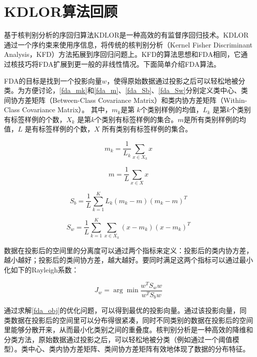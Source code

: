\section{KDLOR算法回顾}
基于核判别分析的序回归算法KDLOR\citep{sun2010kernel}是一种高效的有监督序回归技术。KDLOR通过一个序约束来使用序信息，将传统的核判别分析（Kernel Fisher Discriminant Analysis，KFD）方法拓展到序回归问题上。KFD的算法思想和FDA相同，它通过核技巧将FDA扩展到更一般的非线性情况。下面简单介绍FDA算法。

FDA的目标是找到一个投影向量\(w\)，使得原始数据通过投影之后可以轻松地被分类。为方便讨论，\autoref{fda_mk}和\autoref{fda_m}、\autoref{fda_Sb}、\autoref{fda_Sw}分别定义类中心、类间协方差矩阵（Between-Class Covariance Matrix）和类内协方差矩阵（Within-Class Covariance Matrix）。 其中，\(m_{k}\)是第 \(k\)个类别样例的均值，\(L_{k}\) 是第\(k\)个类别有标签样例的个数，\(X_{k}\) 是第\(k\)个类别有标签样例的集合。\(m\)是所有类别样例的均值，\(L\) 是有标签样例的个数，\(X\) 所有类别有标签样例的集合。

\begin{equation}
\label{fda_mk}
m_{k}=\frac{1}{L_{k}}\sum_{x\in X_{k}}x
\end{equation}

\begin{equation}
\label{fda_m}
m =\frac{1}{L}\sum_{x \in X} x
\end{equation}

\begin{equation}
\label{fda_Sb}
S_{b} = \frac{1}{L}\sum_{k=1}^{K} L_{k} (m_{k} - m)(m_{k} - m)^{T}
\end{equation}

\begin{equation}
\label{fda_Sw}
S_{w} = \frac{1}{L}\sum_{k=1}^{K}\sum_{x\in X_{k}}(x-m_{k})(x-m_{k})^{T}
\end{equation}

数据在投影后的空间里的分离度可以通过两个指标来定义：投影后的类内协方差，越小越好；投影后的类间协方差，越大越好。要同时满足这两个指标可以通过最小化如下的Rayleigh系数：

\begin{equation}
\label{fda_obj}
J_{w} = \arg \min{\frac{w^{T} S_{w} w}{w^{T} S_{b} w} }
\end{equation}

通过求解\autoref{fda_obj}的优化问题，可以得到最优的投影向量。通过该投影向量，同类数据在投影后的空间里可以分布得很紧凑，同时不同类别的数据在投影后的空间里能够分散开来，从而最小化类别之间的重叠度。核判别分析是一种高效的降维和分类方法，原始数据通过投影之后，可以轻松地被分类（例如通过一个阈值模型）。类中心、类内协方差矩阵、类间协方差矩阵有效地体现了数据的分布特征。

